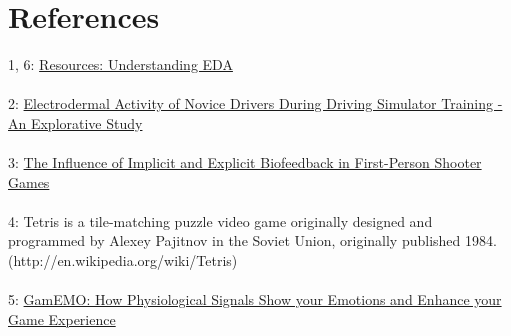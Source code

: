 \documentclass[paper=a4, fontsize=11pt]{scrartcl} %
\numberwithin{equation}{section} %
\numberwithin{figure}{section} %
\numberwithin{table}{section} %
\begin{document}
\section{References}
1, 6: \href{http://www.affectiva.com/q-sensor/resources/understanding-eda/how-is-it-measured/}{Resources: Understanding EDA}
\\ \\
2: \href{http://essay.utwente.nl/61873/1/Schnittker%2C_R._-_s1016350_%28verslag%29.pdf}{Electrodermal Activity of Novice Drivers During Driving Simulator Training - An Explorative Study}
\\ \\
3: \href{http://dl.acm.org/citation.cfm?id=1753453}{The Influence of Implicit and Explicit Biofeedback in First-Person Shooter Games}
\\ \\
4: Tetris is  a tile-matching puzzle video game originally designed and programmed by Alexey Pajitnov in the Soviet Union, originally published 1984. (http://en.wikipedia.org/wiki/Tetris)
\\ \\
5: \href{http://delivery.acm.org/10.1145/2390000/2388738/p297-guillaume.pdf?ip=130.237.226.49&acc=ACTIVE%20SERVICE&CFID=181007248&CFTOKEN=42904175&__acm__=1361128801_dc52e4e7b2b02da7d61b8652f9e5c8f9}{GamEMO: How Physiological Signals Show your Emotions and Enhance your Game Experience}

\end{document}
